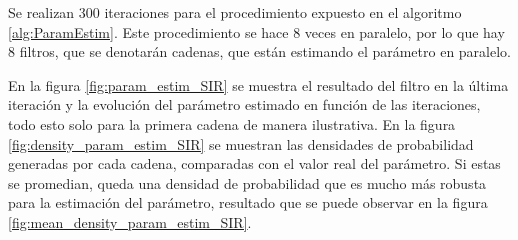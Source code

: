 Se realizan $300$ iteraciones para el procedimiento expuesto en el algoritmo \ref{alg:ParamEstim}. Este procedimiento se hace $8$ veces en paralelo, por lo que hay $8$ filtros, que se denotarán cadenas, que están estimando el parámetro en paralelo. 

En la figura \ref{fig:param_estim_SIR} se muestra el resultado del filtro en la última iteración y la evolución del parámetro estimado en función de las iteraciones, todo esto solo para la primera cadena de manera ilustrativa. En la figura \ref{fig:density_param_estim_SIR} se muestran las densidades de probabilidad generadas por cada cadena, comparadas con el valor real del parámetro. Si estas se promedian, queda una densidad de probabilidad que es mucho más robusta para la estimación del parámetro, resultado que se puede observar en la figura \ref{fig:mean_density_param_estim_SIR}.



